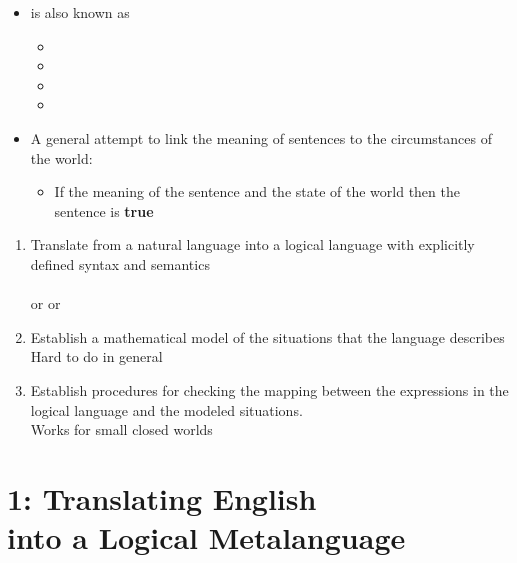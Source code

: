 \documentclass[headrule,footrule]{foils}
\begin{document}
\begin{itemize}
\item {} is also known as
  \begin{itemize}
  \item {}
  \item {}
  \item {}
  \item {}
  \end{itemize}
\item A general attempt to link the meaning of sentences to the
  circumstances of the world: 
  \begin{itemize}
  \item If the meaning of the sentence and the state of the world
     then the sentence is \textbf{true}
  \end{itemize}
\end{itemize}


\begin{enumerate}
\item Translate from a natural language into a logical language
  with explicitly defined syntax and semantics
  \\[1ex]  \into 
  \\  or  or 
\item Establish a mathematical model of the situations that the
  language describes
  \\[1ex] Hard to do in general
\item Establish procedures for checking the mapping between the
  expressions in the logical language and the modeled situations.
  \\[1ex] Works for small closed worlds
\end{enumerate}


\section{1: Translating English \\ into a Logical Metalanguage}
\end{document}
